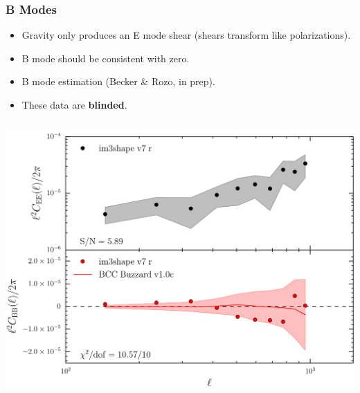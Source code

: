 \documentclass{beamer}
\begin{document}
\frame
{
    \frametitle{B Modes}

    \fontsize{9}{0.8\baselineskip}
    \begin{itemize}

        \item Gravity only produces an E mode shear (shears transform like
            polarizations).

        \item B mode should be consistent with zero.

        \item B mode estimation (Becker \& Rozo, in prep).


        \item These data are {\bf blinded}.

    \end{itemize}

    \begin{columns}

        \begin{column}{0.5\textwidth}
            \begin{center}
                \includegraphics[width=1.05\textwidth]{im3shape_v7_r_crop.pdf}
            \end{center}
        \end{column}


\end{columns}}
\end{document}
